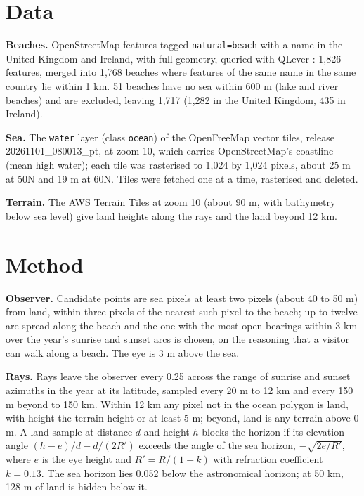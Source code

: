 \documentclass[11pt,a4paper]{article}
\begin{document}
\section{Data}
\textbf{Beaches.} OpenStreetMap \citep{osm} features tagged \texttt{natural=beach} with a name in the United Kingdom and Ireland, with full geometry, queried with QLever \citep{qlever}: 1,826 features, merged into 1,768 beaches where features of the same name in the same country lie within 1 km. 51 beaches have no sea within 600 m (lake and river beaches) and are excluded, leaving 1,717 (1,282 in the United Kingdom, 435 in Ireland).

\textbf{Sea.} The \texttt{water} layer (class \texttt{ocean}) of the OpenFreeMap \citep{openfreemap} vector tiles, release 20261101\_080013\_pt, at zoom 10, which carries OpenStreetMap's coastline (mean high water); each tile was rasterised to 1,024 by 1,024 pixels, about 25 m at 50\textdegree N and 19 m at 60\textdegree N. Tiles were fetched one at a time, rasterised and deleted.

\textbf{Terrain.} The AWS Terrain Tiles at zoom 10 (about 90 m, with bathymetry below sea level) give land heights along the rays and the land beyond 12 km.

\section{Method}
\textbf{Observer.} Candidate points are sea pixels at least two pixels (about 40 to 50 m) from land, within three pixels of the nearest such pixel to the beach; up to twelve are spread along the beach and the one with the most open bearings within 3 km over the year's sunrise and sunset arcs is chosen, on the reasoning that a visitor can walk along a beach. The eye is 3 m above the sea.

\textbf{Rays.} Rays leave the observer every 0.25\textdegree{} across the range of sunrise and sunset azimuths in the year at its latitude, sampled every 20 m to 12 km and every 150 m beyond to 150 km. Within 12 km any pixel not in the ocean polygon is land, with height the terrain height or at least 5 m; beyond, land is any terrain above 0 m. A land sample at distance $d$ and height $h$ blocks the horizon if its elevation angle $(h-e)/d - d/(2R')$ exceeds the angle of the sea horizon, $-\sqrt{2e/R'}$, where $e$ is the eye height and $R' = R/(1-k)$ with refraction coefficient $k=0.13$. The sea horizon lies 0.052\textdegree{} below the astronomical horizon; at 50 km, 128 m of land is hidden below it.
\end{document}
